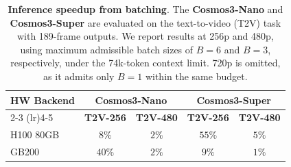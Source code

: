\begin{table}[t]
    \centering
    \caption{
    \textbf{Inference speedup from batching}. The \textbf{Cosmos3-Nano} and \textbf{Cosmos3-Super} are evaluated on the text-to-video (T2V) task with 189-frame outputs. We report results at 256p and 480p, using maximum admissible batch sizes of $B=6$ and $B=3$, respectively, under the 74k-token context limit. 720p is omitted, as it admits only $B=1$ within the same budget.}
    \label{tab:cosmos3_batching}
    \setlength{\tabcolsep}{4pt}
    \small
    \begin{tabular}{l|cc|cc}
        \toprule
        \textbf{HW Backend} &
        \multicolumn{2}{c|}{\textbf{Cosmos3-Nano}} &
        \multicolumn{2}{c}{\textbf{Cosmos3-Super}} \\
        \cmidrule(lr){2-3}
        \cmidrule(lr){4-5}
        &
        \textbf{T2V-256} & \textbf{T2V-480} &
        \textbf{T2V-256} & \textbf{T2V-480} \\
        \midrule
        H100 80GB &
        $8\%$ & $2\%$ &
        $55\%$ & $5\%$ \\
        GB200 &
        $40\%$ & $2\%$ &
        $9\%$ & $1\%$ \\
        \bottomrule
    \end{tabular}
\end{table}
